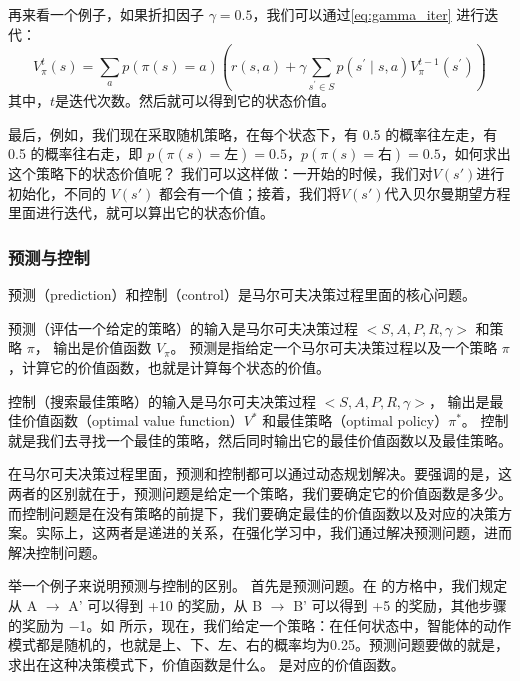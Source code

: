 
再来看一个例子，如果折扣因子 $\gamma=0.5$，我们可以通过\eqref{eq:gamma_iter} 进行迭代：
\begin{equation}
  V^{t}_{\pi}(s)=\sum_{a} p(\pi(s)=a)\left(r(s, a)+\gamma \sum_{s^{\prime} \in S} p\left(s^{\prime} \mid s, a\right) V^{t-1}_{\pi}\left(s^{\prime}\right)\right)
  \label{eq:gamma_iter}
\end{equation}
其中，$t$是迭代次数。然后就可以得到它的状态价值。

最后，例如，我们现在采取随机策略，在每个状态下，有 0.5 的概率往左走，有 0.5 的概率往右走，即 $p(\pi(s)= \text{左})=0.5$，$p(\pi(s)= \text{右})=0.5$，如何求出这个策略下的状态价值呢？
我们可以这样做：一开始的时候，我们对$V(s')$进行初始化，不同的 $V(s')$ 都会有一个值；接着，我们将$V(s')$代入贝尔曼期望方程里面进行迭代，就可以算出它的状态价值。

\subsubsection{预测与控制} 

预测（prediction）和控制（control）是马尔可夫决策过程里面的核心问题。

预测（评估一个给定的策略）的输入是马尔可夫决策过程 $<S,A,P,R,\gamma>$ 和策略 $\pi$，  
输出是价值函数 $V_{\pi}$。
预测是指给定一个马尔可夫决策过程以及一个策略 $\pi$ ，计算它的价值函数，也就是计算每个状态的价值。

控制（搜索最佳策略）的输入是马尔可夫决策过程 $<S,A,P,R,\gamma>$，
输出是最佳价值函数（optimal value function）$V^*$ 和最佳策略（optimal policy）$\pi^*$。
控制就是我们去寻找一个最佳的策略，然后同时输出它的最佳价值函数以及最佳策略。

在马尔可夫决策过程里面，预测和控制都可以通过动态规划解决。要强调的是，这两者的区别就在于，预测问题是给定一个策略，我们要确定它的价值函数是多少。而控制问题是在没有策略的前提下，我们要确定最佳的价值函数以及对应的决策方案。实际上，这两者是递进的关系，在强化学习中，我们通过解决预测问题，进而解决控制问题。

举一个例子来说明预测与控制的区别。
首先是预测问题。在 的方格中，我们规定从 A $\to$ A' 可以得到 +10 的奖励，从 B $\to$ B' 可以得到 +5 的奖励，其他步骤的奖励为 $-$1。如 所示，现在，我们给定一个策略：在任何状态中，智能体的动作模式都是随机的，也就是上、下、左、右的概率均为0.25。预测问题要做的就是，求出在这种决策模式下，价值函数是什么。 是对应的价值函数。

